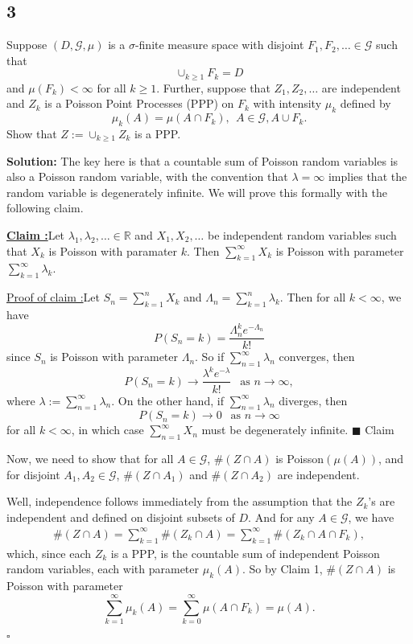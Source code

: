 \documentclass[12pt]{article}
\newcounter{ProofCounter}
\newcounter{ClaimCounter}[ProofCounter]
\newenvironment{Solution}{\stepcounter{ProofCounter}\textbf{Solution:}}{\hfill$\square$}
\newenvironment{claim}[1]{\vspace{1mm}\stepcounter{ClaimCounter}\par\noindent\underline{\bf Claim \theClaimCounter:}\space#1}{}
\newenvironment{claimproof}[1]{\par\noindent\underline{Proof of claim \theClaimCounter:}\space#1}{\hfill $\blacksquare$ Claim \theClaimCounter \\}
\newcommand\toinf{\rightarrow\infty}
\newcommand{\sinf}[1]{\sum_{#1=0}^{\infty}}
\begin{document}
\subsection*{3}
\begin{tcolorbox}
  Suppose $(D, \mathcal{G}, \mu)$ is a $\sigma$-finite measure space with disjoint $F_1, F_2, \dots \in \mathcal{G}$ such that
  \[
    \cup_{k\geq 1}F_k = D
  \]
  and $\mu(F_k) < \infty$ for all $k \geq 1$. Further, suppose that $Z_1, Z_2, \dots$ are independent and $Z_k$ is a Poisson Point Processes (PPP) on $F_k$ with intensity $\mu_k$ defined by
  \[
    \mu_k(A) = \mu(A \cap F_k), \ \ A \in \mathcal{G}, A \cup F_k.
  \]
  Show that $Z := \cup_{k\geq 1} Z_k$ is a PPP.
\end{tcolorbox}
\begin{Solution}
  The key here is that a countable sum of Poisson random variables is also a Poisson random variable, with the convention that $\lambda = \infty$ implies that the random variable is degenerately infinite. We will prove this formally with the following claim.

  \begin{claim}
    Let $\lambda_1, \lambda_2, \dots \in \mathbb{R}$ and $X_1, X_2, \dots$ be independent random variables such that $X_k$ is Poisson with paramater $k$. Then $\sum_{k=1}^{\infty}X_k$ is Poisson with parameter $\sum_{k=1}^{\infty} \lambda_k$.
  \end{claim}
  \begin{claimproof}
    Let $S_n = \sum_{k=1}^{n}X_k$ and $\Lambda_n = \sum_{k=1}^{n} \lambda_k$. Then for all $k < \infty$, we have
    \[
      P(S_n = k) = \frac{\Lambda_n^k e^{-\Lambda_n}}{k!}
    \]
    since $S_n$ is Poisson with parameter $\Lambda_n$. So if $\sum_{n=1}^{\infty}\lambda_n$ converges, then
    \[
      P(S_n = k) \rightarrow \frac{\lambda^k e^{-\lambda}}{k!} \ \ \text{ as } n\rightarrow \infty,
    \]
    where $\lambda := \sum_{n=1}^{\infty}\lambda_n$. On the other hand, if $\sum_{n=1}^{\infty}\lambda_n$ diverges, then
    \[
      P(S_n = k) \rightarrow 0 \ \ \text{ as } n \toinf
    \]
    for all $k < \infty$, in which case $\sum_{n=1}^{\infty}X_n$ must be degenerately infinite.
  \end{claimproof}

  Now, we need to show that for all $A \in \mathcal{G}$, $\#(Z \cap A)$ is Poisson$(\mu(A))$, and for disjoint $A_1, A_2 \in \mathcal{G}$, $\#(Z \cap A_1)$ and $\#(Z\cap A_2)$ are independent.
  
  Well, independence follows immediately from the assumption that the $Z_k$'s are independent and defined on disjoint subsets of $D$. And for any $A \in \mathcal{G}$, we have
  \begin{align*}
    \#(Z \cap A) = \sum_{k=1}^{\infty} \#(Z_k \cap A) = \sum_{k=1}^{\infty} \#(Z_k \cap A \cap F_k),
  \end{align*}
  which, since each $Z_k$ is a PPP, is the countable sum of independent Poisson random variables, each with parameter $\mu_k(A)$. So by Claim 1, $\#(Z \cap A)$ is Poisson with parameter
  \[
    \sum_{k=1}^{\infty} \mu_k(A) = \sinf{k} \mu(A \cap F_k) = \mu(A).
  \]
  
\end{Solution}
\end{document}
